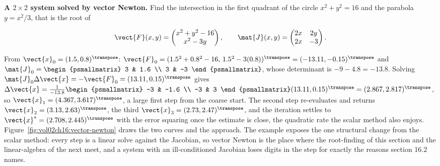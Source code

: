 \begin{example}
\textbf{A $2\times2$ system solved by vector Newton.} Find the intersection in
the first quadrant of the circle $x^{2} + y^{2} = 16$ and the parabola $y =
x^{2}/3$, that is the root of

\[
\vect{F}(x, y) = \begin{pmatrix} x^{2} + y^{2} - 16 \\ x^{2} - 3 y
\end{pmatrix}, \qquad
\mat{J}(x, y) = \begin{pmatrix} 2x & 2y \\ 2x & -3 \end{pmatrix}.
\]

From $\vect{x}_{0} = (1.5, 0.8)^{\transpose}$: $\vect{F}_{0} = (1.5^{2} +
0.8^{2} - 16,\, 1.5^{2} - 3(0.8))^{\transpose} = (-13.11, -0.15)^{\transpose}$
and $\mat{J}_{0} = \begin{psmallmatrix} 3 & 1.6 \\ 3 & -3 \end{psmallmatrix}$,
whose determinant is $-9 - 4.8 = -13.8$. Solving $\mat{J}_{0}\Delta\vect{x} =
-\vect{F}_{0} = (13.11, 0.15)^{\transpose}$ gives $\Delta\vect{x} =
\tfrac{1}{-13.8}\begin{psmallmatrix} -3 & -1.6 \\ -3 & 3 \end{psmallmatrix}
(13.11, 0.15)^{\transpose} = (2.867, 2.817)^{\transpose}$, so $\vect{x}_{1} =
(4.367, 3.617)^{\transpose}$, a large first step from the coarse start. The
second step re-evaluates and returns $\vect{x}_{2} = (3.13, 2.63)^{\transpose}$,
the third $\vect{x}_{3} = (2.73, 2.47)^{\transpose}$, and the iteration settles
to $\vect{x}^{*} = (2.708, 2.445)^{\transpose}$ with the error squaring once
the estimate is close, the quadratic rate the scalar method also enjoys.
Figure~\ref{fig:vol02ch16:vector-newton} draws the two curves and the
approach. The example exposes the one structural change from the scalar
method: every step is a linear solve against the Jacobian, so vector Newton is
the place where the root-finding of this section and the linear-algebra of the
next meet, and a system with an ill-conditioned Jacobian loses digits in the
step for exactly the reasons section 16.2 names.
\end{example}



